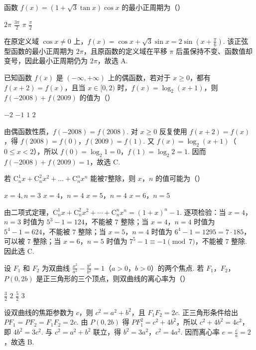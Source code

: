 \begin{problem}
函数 \( f(x) = (1 + \sqrt{3}\tan x)\cos x \) 的最小正周期为（\quad）

\choices
    {\(2\pi\)}
    {\( \frac{3\pi}{2} \)}
    {\(\pi\)}
    {\(\frac{\pi}{2}\)}
\begin{solution}
在原定义域 \(\cos x\neq0\) 上，\(f(x)=\cos x+\sqrt{3}\sin x=2\sin\left(x+\frac{\pi}{6}\right)\). 该正弦型函数的最小正周期为 \(2\pi\)，且原函数的定义域在平移 \(\pi\) 后虽保持不变、函数值却变号，因此最小正周期仍为 \(2\pi\)，故选 A.
\end{solution}
\end{problem}

\begin{problem}
已知函数 \( f(x) \) 是 \((- \infty, +\infty)\) 上的偶函数，若对于 \( x \geqslant 0 \)，都有 \( f(x + 2) = f(x) \)，且当 \( x \in [0, 2) \) 时，\( f(x) = \log_2(x + 1) \)，则 \( f(-2008) + f(2009) \) 的值为（\quad）

\choices
    {\(-2\)}
    {\(-1\)}
    {\(1\)}
    {\(2\)}
\begin{solution}
由偶函数性质，\(f(-2008)=f(2008)\). 对 \(x\geqslant0\) 反复使用 \(f(x+2)=f(x)\)，得 \(f(2008)=f(0)\)，\(f(2009)=f(1)\). 又 \(f(x)=\log_{2}(x+1)\)（\(0\leqslant x<2\)），所以
\(f(0)=\log_{2}1=0\)，\(f(1)=\log_{2}2=1\). 因而 \(f(-2008)+f(2009)=1\)，故选 C.
\end{solution}
\end{problem}

\begin{problem}
若 \(\mathrm C_n^1 x + \mathrm C_n^2 x^2 + \dots + \mathrm C_n^n x^n\) 能被\(7\)整除，则 \(x\)，\(n\) 的值可能为（\quad）

\choices
    {\(x = 4, n = 3\)}
    {\(x = 4\)，\(n = 4\)}
    {\(x = 5\)，\(n = 4\)}
    {\(x = 6\)，\(n = 5\)}
\begin{solution}
由二项式定理，\(\mathrm C_n^1x+\mathrm C_n^2x^2+\cdots+\mathrm C_n^nx^n=(1+x)^n-1\). 逐项检验：当 \(x=4\)，\(n=3\) 时值为 \(5^3-1=124\)，不能被 \(7\) 整除；当 \(x=4\)，\(n=4\) 时值为 \(5^4-1=624\)，不能被 \(7\) 整除；当 \(x=5\)，\(n=4\) 时值为 \(6^4-1=1295=7\cdot185\)，可以被 \(7\) 整除；当 \(x=6\)，\(n=5\) 时值为 \(7^5-1\equiv-1\pmod 7\)，不能被 \(7\) 整除. 因此选 C.
\end{solution}
\end{problem}

\begin{problem}
设 \(F_{1}\) 和 \(F_{2}\) 为双曲线 \(\frac{x^2}{a^2} -\frac{y^2}{b^2} = 1\)（\(a > 0\)，\(b > 0\)）的两个焦点. 若 \(F_{1}\)，\(F_{2}\)， \(P(0,2b)\) 是正三角形的三个顶点，则双曲线的离心率为（\quad）

\choices
    {\(\frac{3}{2}\)}
    {\(2\)}
    {\(\frac{5}{2}\)}
    {\(3\)}
\begin{solution}
设双曲线的焦距参数为 \(c\)，则 \(c^{2}=a^{2}+b^{2}\)，且 \(F_{1}F_{2}=2c\). 正三角形条件给出
\(PF_{1}=PF_{2}=F_{1}F_{2}=2c\). 由 \(P(0,2b)\) 得 \(PF_{1}^{2}=c^{2}+4b^{2}\)，所以 \(c^{2}+4b^{2}=4c^{2}\)，即 \(4b^{2}=3c^{2}\). 与 \(c^{2}=a^{2}+b^{2}\) 联立，得 \(b^{2}=3a^{2}\)，\(c^{2}=4a^{2}\). 因而离心率 \(e=\frac{c}{a}=2\)，故选 B.
\end{solution}
\end{problem}

